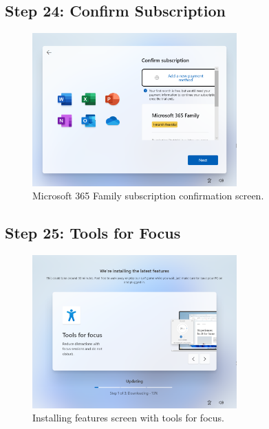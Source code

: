 \documentclass{article}
\begin{document}
\subsection{Step 24: Confirm Subscription}
\begin{figure}[H]
    \centering
    \includegraphics[width=0.7\textwidth]{2024-09-17_15-31-15.png}
    \caption{Microsoft 365 Family subscription confirmation screen.}
    \label{fig:subscription}
\end{figure}

\subsection{Step 25: Tools for Focus}
\begin{figure}[H]
    \centering
    \includegraphics[width=0.7\textwidth]{2024-09-17_15-33-48.png}
    \caption{Installing features screen with tools for focus.}
    \label{fig:focus_tools}
\end{figure}
\end{document}
